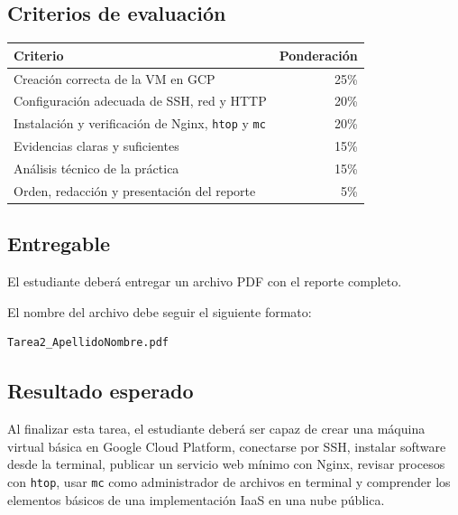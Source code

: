 \documentclass[
  coursetitle={Cómputo Nube y Tecnologías Emergentes},
  coursehours={96},
  coursedate={Verano 2026},
  doctype={Tarea 2},
  otherlangs={english,french},
  authorname={Lázaro},
  authorsurname={Bustio-Martínez},
  authortitle={PhD},
  role={Profesor Investigador},
  email={lbustio@inaoe.mx},
  phone={5559504000},
  ext={7459},
  institution={Instituto Nacional de Astrofísica, Óptica y Electrónica (INAOE)},
  department={Maestría en Ciencias en Tecnologías de Seguridad},
  address={Luis Enrique Erro 1, Sta. Ma. Tonantzintla, San Andrés Cholula, CP 72840, Puebla, México},
  margin={0.5in}
]{../../../lbustio_lecture_notes}
\begin{document}
\subsection{Criterios de evaluación}
\label{sec:tarea2-criterios}

\begin{center}
\begin{tabular}{|p{}|r|}
\hline
\textbf{Criterio} & \textbf{Ponderación} \\
\hline
Creación correcta de la VM en GCP & 25\% \\
\hline
Configuración adecuada de SSH, red y HTTP & 20\% \\
\hline
Instalación y verificación de Nginx, \texttt{htop} y \texttt{mc} & 20\% \\
\hline
Evidencias claras y suficientes & 15\% \\
\hline
Análisis técnico de la práctica & 15\% \\
\hline
Orden, redacción y presentación del reporte & 5\% \\
\hline
\end{tabular}
\end{center}

\subsection{Entregable}
\label{sec:tarea2-entregable}

El estudiante deberá entregar un archivo PDF con el reporte completo.

El nombre del archivo debe seguir el siguiente formato:

\begin{verbatim}
Tarea2_ApellidoNombre.pdf
\end{verbatim}

\subsection{Resultado esperado}
\label{sec:tarea2-resultado}

Al finalizar esta tarea, el estudiante deberá ser capaz de crear una máquina virtual básica en Google Cloud Platform, conectarse por SSH, instalar software desde la terminal, publicar un servicio web mínimo con Nginx, revisar procesos con \texttt{htop}, usar \texttt{mc} como administrador de archivos en terminal y comprender los elementos básicos de una implementación IaaS en una nube pública.
\end{document}

